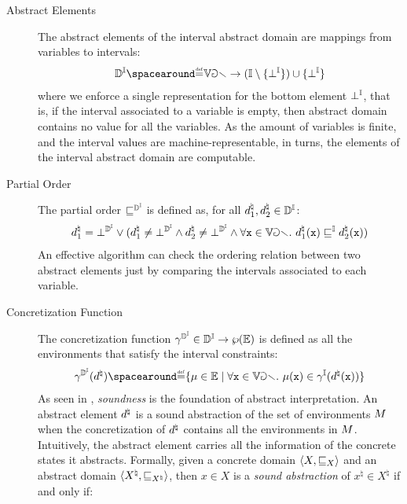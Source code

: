   \begin{description}
    \item[Abstract Elements] The abstract elements of the interval abstract domain are mappings from variables to intervals:
    \begin{align*}
      \intervalabstractdomaintype \DefeQ \variables \to (\intervaltype \setminus \{\intervalbottom\}) \setjoin \{\intervalbottom\}
    \end{align*}
    where we enforce a single representation for the bottom element $\bot^{\mathbb{I}}$, that is, if the interval associated to a variable is empty, then abstract domain contains no value for all the variables.
    As the amount of variables is finite, and the interval values are machine-representable, in turns, the elements of the interval abstract domain are computable.
    \item[Partial Order] The partial order $\sqsubseteq^{\mathbb{D}^{\mathbb{I}}}$ is defined as, for all $d^\natural_1, d^\natural_2 \in \mathbb{D}^{\mathbb{I}}$:
    \begin{align*}
      d^\natural_1 = \bot^{\mathbb{D}^{\mathbb{I}}} \lor (d^\natural_1 \neq \bot^{\mathbb{D}^{\mathbb{I}}} \land d^\natural_2 \neq \bot^{\mathbb{D}^{\mathbb{I}}} \land \forall \textup{\texttt{x}} \in \mathbb{Var}.~ d^\natural_1(\textup{\texttt{x}}) \sqsubseteq^{\mathbb{I}} d^\natural_2(\textup{\texttt{x}}))
    \end{align*}
    An effective algorithm can check the ordering relation between two abstract elements just by comparing the intervals associated to each variable.
    \item[Concretization Function] The concretization function $\gamma^{\mathbb{D}^{\mathbb{I}}}\in\mathbb{D}^{\mathbb{I}}\to\wp(\mathbb{E})$ is defined as all the environments that satisfy the interval constraints:
    \begin{align*}
      \intervalabstractdomainconcretization(\defabstractvalue) \DefeQ \setdef{\defenv\in\env}{\forall \defvariable\in\variables.\spacer \defenv(\defvariable) \in \intervalconcretization(\defabstractvalue(\defvariable))}
    \end{align*}
    As seen in , \emph{soundness} is the foundation of abstract interpretation. An abstract element $d^\natural$ is a sound abstraction of the set of environments $M$ when the concretization of $d^\natural$ contains all the environments in $M$. Intuitively, the abstract element carries all the information of the concrete states it abstracts. Formally, given a concrete domain $\langle X, \sqsubseteq_X \rangle$ and an abstract domain $\langle X^\natural, \sqsubseteq_{X^\natural} \rangle$, then $x\in X$ is a \emph{sound abstraction} of $x^\natural\in X^\natural$ if and only if:

\end{description}
